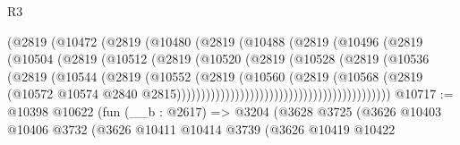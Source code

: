\begin{lexlean}{R3}
\begin{coremodule}
                                    (@2819
                                      (@10472
                                        (@2819
                                          (@10480
                                            (@2819
                                              (@10488
                                                (@2819
                                                  (@10496
                                                    (@2819
                                                      (@10504
                                                        (@2819
                                                          (@10512
                                                            (@2819
                                                              (@10520
                                                                (@2819
                                                                  (@10528
                                                                    (@2819
                                                                      (@10536
                                                                        (@2819
                                                                          (@10544
                                                                            (@2819
                                                                              (@10552
                                                                                (@2819
                                                                                  (@10560
                                                                                    (@2819
                                                                                      (@10568
                                                                                        (@2819
                                                                                          (@10572
                                                                                            @10574
                                                                                            @2840
                                                                                            @2815))))))))))))))))))))))))))))))))))))))))))))
@10717 := @10398
    @10622
    (fun (__b : @2617) =>
    @3204
      (@3628
        @3725
        (@3626
          @10403
          @10406
          @3732
          (@3626
            @10411
            @10414
            @3739
            (@3626
              @10419
              @10422

\end{coremodule}
\end{lexlean}
